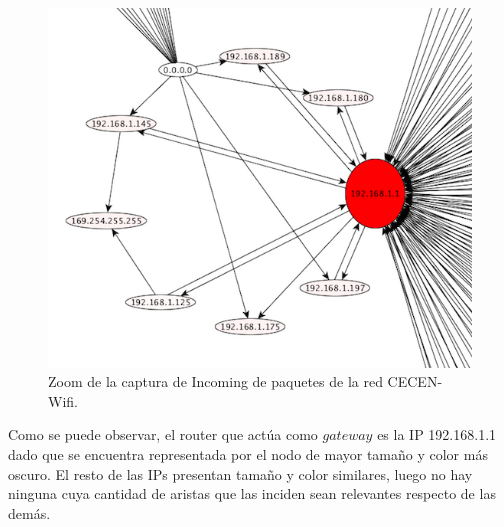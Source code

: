 \documentclass[10pt, a4paper]{article}
\begin{document}
\begin{figure}[H] %
\begin{center}
\includegraphics[width=400pt]{../imgs/zoom-cecen-incoming.png}
\caption{Zoom de la captura de Incoming de paquetes de la red CECEN-Wifi.}
\end{center}
\end{figure}

Como se puede observar, el router que actúa como $gateway$ es la IP 192.168.1.1 dado que se encuentra representada por el nodo de mayor tamaño y color más oscuro. El resto de las IPs presentan tamaño y color similares, luego no hay ninguna cuya cantidad de aristas que las inciden sean relevantes respecto de las demás.
\end{document}
